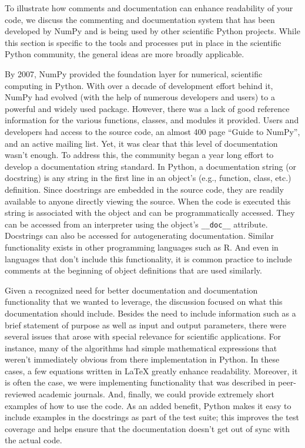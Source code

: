 \documentclass[ChapterTOCs,krantz2]{krantz} %
\begin{document}
To illustrate how comments and documentation can enhance readability of your
code, we discuss the commenting and documentation system that has been
developed by NumPy and is being used by other scientific Python projects. While
this section is specific to the tools and processes put in place in the
scientific Python community, the general ideas are more broadly applicable.

By 2007, NumPy provided the foundation layer for numerical, scientific
computing in Python. With over a decade of development effort behind it, NumPy
had evolved (with the help of numerous developers and users) to a powerful and
widely used package. However, there was a lack of good reference information
for the various functions, classes, and modules it provided. Users and
developers had access to the source code, an almost 400 page ``Guide to
NumPy'', and an active mailing list. Yet, it was clear that this level of
documentation wasn't enough. To address this, the community began a year long
effort to develop a documentation string standard. In Python, a documentation
string (or docstring) is any string in the first line in an object's (e.g.,
function, class, etc.) definition. Since docstrings are embedded in the source
code, they are readily available to anyone directly viewing the source. When
the code is executed this string is associated with the object and can be
programmatically accessed.  They can be accessed from an interpreter using the
object's \texttt{\_\_doc\_\_} attribute.  Docstrings can also be accessed for
autogenerating documentation.  Similar functionality exists in other
programming languages such as R. And even in languages that don't include this
functionality, it is common practice to include comments at the beginning of
object definitions that are used similarly.

Given a recognized need for better documentation and documentation
functionality that we wanted to leverage, the discussion focused on what this
documentation should include. Besides the need to include information such as a
brief statement of purpose as well as input and output parameters, there were
several issues that arose with special relevance for scientific applications.
For instance, many of the algorithms had simple mathematical expressions that
weren't immediately obvious from there implementation in Python. In these
cases, a few equations written in \LaTeX{} greatly enhance readability.
Moreover, it is often the case, we were implementing functionality that was
described in peer-reviewed academic journals. And, finally, we could provide
extremely short examples of how to use the code. As an added benefit, Python
makes it easy to include examples in the docstrings as part of the test suite;
this improves the test coverage and helps ensure that the documentation doesn't
get out of sync with the actual code.
\end{document}
